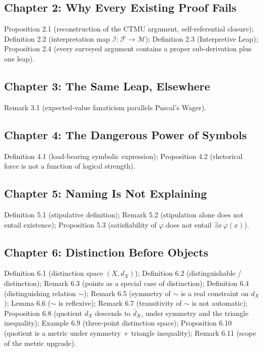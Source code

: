 \documentclass[11pt]{book}
\begin{document}
\subsection*{Chapter 2: Why Every Existing Proof Fails}
Proposition 2.1 (reconstruction of the CTMU argument, self-referential closure); Definition 2.2 (interpretation map $\mathcal I:\mathcal F\to\mathcal M$); Definition 2.3 (Interpretive Leap); Proposition 2.4 (every surveyed argument contains a proper sub-derivation plus one leap).

\subsection*{Chapter 3: The Same Leap, Elsewhere}
Remark 3.1 (expected-value fanaticism parallels Pascal's Wager).

\subsection*{Chapter 4: The Dangerous Power of Symbols}
Definition 4.1 (load-bearing symbolic expression); Proposition 4.2 (rhetorical force is not a function of logical strength).

\subsection*{Chapter 5: Naming Is Not Explaining}
Definition 5.1 (stipulative definition); Remark 5.2 (stipulation alone does not entail existence); Proposition 5.3 (satisfiability of $\varphi$ does not entail $\exists x\,\varphi(x)$).

\subsection*{Chapter 6: Distinction Before Objects}
Definition 6.1 (distinction space $(X,d_X)$); Definition 6.2 (distinguishable / distinction); Remark 6.3 (points as a special case of distinction); Definition 6.4 (distinguishing relation $\sim$); Remark 6.5 (symmetry of $\sim$ is a real constraint on $d_X$); Lemma 6.6 ($\sim$ is reflexive); Remark 6.7 (transitivity of $\sim$ is not automatic); Proposition 6.8 (quotient $d_X$ descends to $\bar d_X$, under symmetry and the triangle inequality); Example 6.9 (three-point distinction space); Proposition 6.10 (quotient is a metric under symmetry + triangle inequality); Remark 6.11 (scope of the metric upgrade).
\end{document}
